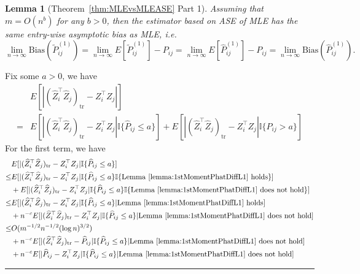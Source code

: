 \documentclass[a4paper]{article}
\newenvironment{proof}{{\bf Proof:  }}{\hfill\rule{2mm}{2mm}}
\newtheorem{lemma}[fact]{Lemma}
\renewcommand{\hat}{\widehat}
\begin{document}
\begin{lemma}[Theorem~\ref{thm:MLEvsMLEASE} Part 1]
\label{lm:L1Consistentproof}
Assuming that $m = O(n^b)$ for any $b > 0$, then the estimator based on ASE of MLE has the same entry-wise asymptotic bias as MLE, i.e.\ 
\[
	\lim_{n \to \infty} \mathrm{Bias}(\widetilde{P}_{ij}^{(1)}) = \lim_{n \to \infty} E[\widetilde{P}_{ij}^{(1)}] - P_{ij} = \lim_{n \to \infty} E[\hat{P}^{(1)}_{ij}] - P_{ij}
    = \lim_{n \to \infty} \mathrm{Bias}(\hat{P}_{ij}^{(1)}).
\]
\end{lemma}
\begin{proof}
Fix some $a > 0$, we have
\begin{align*}
	& E[|(\hat{Z}_i^{\top} \hat{Z}_j)_{\mathrm{tr}} - Z_i^{\top} Z_j|] \\
	= & E[|(\hat{Z}_i^{\top} \hat{Z}_j)_{\mathrm{tr}} - Z_i^{\top} Z_j| \mathbb{I}\{\hat{P}_{ij} \le a\}]
	+ E[|(\hat{Z}_i^{\top} \hat{Z}_j)_{\mathrm{tr}} - Z_i^{\top} Z_j| \mathbb{I}\{\hat{P}_{ij} > a\}]
\end{align*}
For the first term, we have
\begin{align*}
	& E[|(\hat{Z}_i^{\top} \hat{Z}_j)_{\mathrm{tr}} - Z_i^{\top} Z_j| \mathbb{I}\{\hat{P}_{ij} \le a\}] \\
	\le & E[|(\hat{Z}_i^{\top} \hat{Z}_j)_{\mathrm{tr}} - Z_i^{\top} Z_j| \mathbb{I}\{\hat{P}_{ij} \le a\} \mathbb{I}\{\mathrm{Lemma\ } \ref{lemma:1stMomentPhatDiffL1} \mathrm{\ holds}\}] \\
	& + E[|(\hat{Z}_i^{\top} \hat{Z}_j)_{\mathrm{tr}} - Z_i^{\top} Z_j| \mathbb{I}\{\hat{P}_{ij} \le a\} \mathbb{I}\{\mathrm{Lemma\ } \ref{lemma:1stMomentPhatDiffL1} \mathrm{\ does\ not\ hold}\}] \\
	\le & E[|(\hat{Z}_i^{\top} \hat{Z}_j)_{\mathrm{tr}} - Z_i^{\top} Z_j| \mathbb{I}\{\hat{P}_{ij} \le a\} | \mathrm{Lemma\ } \ref{lemma:1stMomentPhatDiffL1} \mathrm{\ holds}] \\
	& + n^{-c} E[|(\hat{Z}_i^{\top} \hat{Z}_j)_{\mathrm{tr}} - Z_i^{\top} Z_j| \mathbb{I}\{\hat{P}_{ij} \le a\} | \mathrm{Lemma\ } \ref{lemma:1stMomentPhatDiffL1} \mathrm{\ does\ not\ hold}] \\
	\le & O(m^{-1/2} n^{-1/2} (\log n)^{3/2}) \\
	& + n^{-c} E[|(\hat{Z}_i^{\top} \hat{Z}_j)_{\mathrm{tr}} - \hat{P}_{ij}| \mathbb{I}\{\hat{P}_{ij} \le a\}| \mathrm{Lemma\ } \ref{lemma:1stMomentPhatDiffL1} \mathrm{\ does\ not\ hold}] \\
	& + n^{-c} E[|\hat{P}_{ij} - Z_i^{\top} Z_j| \mathbb{I}\{\hat{P}_{ij} \le a\}| \mathrm{Lemma\ } \ref{lemma:1stMomentPhatDiffL1} \mathrm{\ does\ not\ hold}] \\

\end{align*}
\end{proof}
\end{document}

